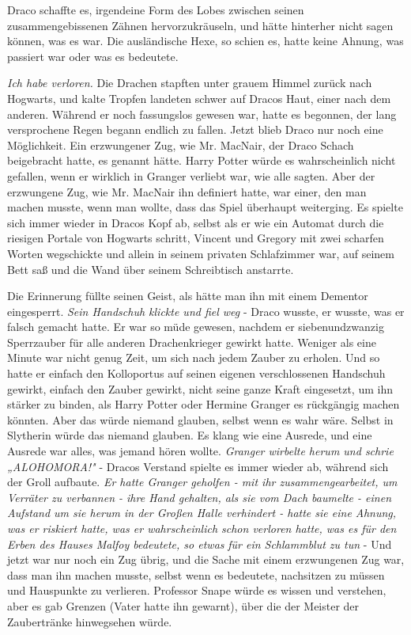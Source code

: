 {Draco schaffte es, irgendeine Form des Lobes zwischen seinen zusammengebissenen Zähnen hervorzukräuseln, und hätte hinterher nicht sagen können, was es war. Die ausländische Hexe, so schien es, hatte keine Ahnung, was passiert war oder was es bedeutete.

\emph{Ich habe verloren.} Die Drachen stapften unter grauem Himmel zurück nach Hogwarts, und kalte Tropfen landeten schwer auf Dracos Haut, einer nach dem anderen. Während er noch fassungslos gewesen war, hatte es begonnen, der lang versprochene Regen begann endlich zu fallen. Jetzt blieb Draco nur noch eine Möglichkeit. Ein erzwungener Zug, wie Mr. MacNair, der Draco Schach beigebracht hatte, es genannt hätte. Harry Potter würde es wahrscheinlich nicht gefallen, wenn er wirklich in Granger verliebt war, wie alle sagten. Aber der erzwungene Zug, wie Mr. MacNair ihn definiert hatte, war einer, den man machen musste, wenn man wollte, dass das Spiel überhaupt weiterging. Es spielte sich immer wieder in Dracos Kopf ab, selbst als er wie ein Automat durch die riesigen Portale von Hogwarts schritt, Vincent und Gregory mit zwei scharfen Worten wegschickte und allein in seinem privaten Schlafzimmer war, auf seinem Bett saß und die Wand über seinem Schreibtisch anstarrte.

Die Erinnerung füllte seinen Geist, als hätte man ihn mit einem Dementor eingesperrt. \emph{Sein Handschuh klickte und fiel weg} - Draco wusste, er wusste, was er falsch gemacht hatte. Er war so müde gewesen, nachdem er siebenundzwanzig Sperrzauber für alle anderen Drachenkrieger gewirkt hatte. Weniger als eine Minute war nicht genug Zeit, um sich nach jedem Zauber zu erholen. Und so hatte er einfach den Kolloportus auf seinen eigenen verschlossenen Handschuh gewirkt, einfach den Zauber gewirkt, nicht seine ganze Kraft eingesetzt, um ihn stärker zu binden, als Harry Potter oder Hermine Granger es rückgängig machen könnten. Aber das würde niemand glauben, selbst wenn es wahr wäre. Selbst in Slytherin würde das niemand glauben. Es klang wie eine Ausrede, und eine Ausrede war alles, was jemand hören wollte. \emph{Granger wirbelte herum und schrie „ALOHOMORA!"} - Dracos Verstand spielte es immer wieder ab, während sich der Groll aufbaute. \emph{Er hatte Granger geholfen - mit ihr zusammengearbeitet, um Verräter zu verbannen - ihre Hand gehalten, als sie vom Dach baumelte - einen Aufstand um sie herum in der Großen Halle verhindert - hatte sie eine Ahnung, was er riskiert hatte, was er wahrscheinlich schon verloren hatte, was es für den Erben des Hauses Malfoy bedeutete, so etwas} \emph{für ein Schlammblut zu tun} - Und jetzt war nur noch ein Zug übrig, und die Sache mit einem erzwungenen Zug war, dass man ihn machen musste, selbst wenn es bedeutete, nachsitzen zu müssen und Hauspunkte zu verlieren. Professor Snape würde es wissen und verstehen, aber es gab Grenzen (Vater hatte ihn gewarnt), über die der Meister der Zaubertränke hinwegsehen würde.

}
